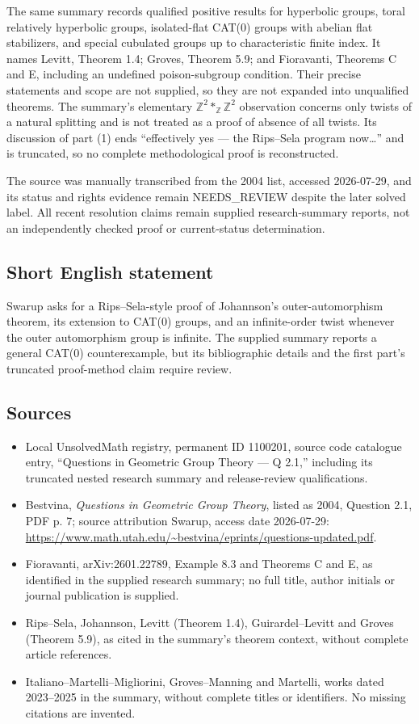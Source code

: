 \documentclass[11pt]{article}
\newcommand{\Z}{\mathbb{Z}}
\begin{document}
The same summary records qualified positive results for hyperbolic groups, toral relatively hyperbolic groups, isolated-flat CAT(0) groups with abelian flat stabilizers, and special cubulated groups up to characteristic finite index. It names Levitt, Theorem 1.4; Groves, Theorem 5.9; and Fioravanti, Theorems C and E, including an undefined poison-subgroup condition. Their precise statements and scope are not supplied, so they are not expanded into unqualified theorems. The summary's elementary \(\Z^2*_{\Z}\Z^2\) observation concerns only twists of a natural splitting and is not treated as a proof of absence of all twists. Its discussion of part (1) ends ``effectively yes --- the Rips--Sela program now\ldots'' and is truncated, so no complete methodological proof is reconstructed.

The source was manually transcribed from the 2004 list, accessed 2026-07-29, and its status and rights evidence remain NEEDS\_REVIEW despite the later solved label. All recent resolution claims remain supplied research-summary reports, not an independently checked proof or current-status determination.
\subsection{Short English statement}
Swarup asks for a Rips--Sela-style proof of Johannson's outer-automorphism theorem, its extension to CAT(0) groups, and an infinite-order twist whenever the outer automorphism group is infinite. The supplied summary reports a general CAT(0) counterexample, but its bibliographic details and the first part's truncated proof-method claim require review.
\subsection{Sources}
\begin{itemize}
\item Local UnsolvedMath registry, permanent ID 1100201, source code catalogue entry, ``Questions in Geometric Group Theory --- Q 2.1,'' including its truncated nested research summary and release-review qualifications.
\item Bestvina, \emph{Questions in Geometric Group Theory}, listed as 2004, Question 2.1, PDF p. 7; source attribution Swarup, access date 2026-07-29: \url{https://www.math.utah.edu/~bestvina/eprints/questions-updated.pdf}.
\item Fioravanti, arXiv:2601.22789, Example 8.3 and Theorems C and E, as identified in the supplied research summary; no full title, author initials or journal publication is supplied.
\item Rips--Sela, Johannson, Levitt (Theorem 1.4), Guirardel--Levitt and Groves (Theorem 5.9), as cited in the summary's theorem context, without complete article references.
\item Italiano--Martelli--Migliorini, Groves--Manning and Martelli, works dated 2023--2025 in the summary, without complete titles or identifiers. No missing citations are invented.
\end{itemize}
\end{document}
